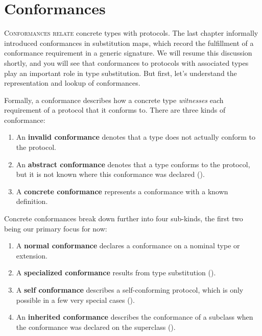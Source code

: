 \documentclass[../generics]{subfiles}
\begin{document}
\chapter{Conformances}\label{conformances}

\lettrine{C}{onformances relate} concrete types with protocols. The last chapter informally introduced conformances in substitution maps, which record the fulfillment of a conformance requirement in a generic signature. We will resume this discussion shortly, and you will see that conformances to protocols with associated types play an important role in type substitution. But first, let's understand the representation and lookup of conformances.

Formally, a conformance describes how a concrete type \emph{witnesses} each requirement of a protocol that it conforms to. There are three kinds of conformance:
\begin{enumerate}
\item An \textbf{invalid conformance} denotes that a type does not actually conform to the protocol.
\item An \textbf{abstract conformance} denotes that a type conforms to the protocol, but it is not known where this conformance was declared ().
\item A \textbf{concrete conformance} represents a conformance with a known definition.
\end{enumerate}

Concrete conformances break down further into four sub-kinds, the first two being our primary focus for now:
\begin{enumerate}
\item A \textbf{normal conformance} declares a conformance on a nominal type or extension.
\item A \textbf{specialized conformance} results from type substitution ().
\item A \textbf{self conformance} describes a self-conforming protocol, which is only possible in a few very special cases ().
\item An \textbf{inherited conformance} describes the conformance of a subclass when the conformance was declared on the superclass ().
\end{enumerate}
\end{document}
